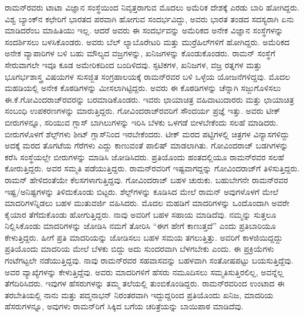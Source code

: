 ರಾಮನ್‍ರವರು ಟಾಟಾ ವಿಜ್ಞಾನ ಸಂಸ್ಥೆಯಿಂದ ನಿವೃತ್ತರಾಗುವ ಮೊದಲು ಅಮೆರಿಕ ದೇಶಕ್ಕೆ ಎರಡು ಬಾರಿ ಹೋಗಿದ್ದರು. ವಿಶ್ವ ಬ್ಯಾಂಕ್‍ನ ಕಛೇರಿಗೆ ಭಾರತದ ಪರವಾಗಿ ಹೋಗುವ ಸಂದರ್ಭವಿದ್ದು, ಅವರು ಭಾರತ ತಂಡದ ಸದಸ್ಯರಾಗಿ ಏನು ಮಾಡಿದರೆಂಬ ಮಾಹಿತಿಯು ಇಲ್ಲ. ಆದರೆ ಅವರು ಈ ಸಂದರ್ಭವನ್ನು ಅಮೆರಿಕದ ಅನೇಕ ವಿಜ್ಞಾನ ಸಂಸ್ಥೆಗಳನ್ನು ಸಂದರ್ಶಿಸಲು ಬಳಸಿಕೊಂಡರು. ಅವರು ಬೆಲ್ ಲ್ಯಾಬೊರೇಟರಿ ಮತ್ತು ಮುರ್ರೆಹಿಲ್‍ಗಳಿಗೆ ಹೋಗಿದ್ದರು. ಅಮೆರಿಕದ ಅನೇಕ ವ್ಯಾಪಾರಿಗಳ ಬಳಿ ಬಹು ಮೌಲ್ಯದ ವಜ್ರಗಳನ್ನು, ಖನಿಜಗಳನ್ನು ಕೊಂಡುಕೊಂಡರು. ರಾಮನ್ ಸಂಸ್ಥೆಗೆ ಸೇರುವಾಗಲೇ ಇವೂ ಕೂಡ ಅಮೇರಿಕದಿಂದ ಬಂದಿಳಿದವು. ಸ್ಫಟಿಕಗಳ, ಖನಿಜಗಳ, ವಜ್ರ ರತ್ನಗಳ ಮತ್ತು ಭೂಗರ್ಭಶಾಸ್ತ್ರ ವಿಷಯಗಳ ಸುಸಜ್ಜಿತ ಸಂಗ್ರಹಾಲಯಕ್ಕೆ ರಾಮನ್‍ರವರ ಬಳಿ ಒಳ್ಳೆಯ ಯೋಜನೆಗಳಿದ್ದವು. ಮೊದಲ ಮಹಡಿಯಲ್ಲಿ ಅನೇಕ ಕೊಠಡಿಗಳನ್ನು ಮೀಸಲಾಗಿಟ್ಟಿದ್ದರು. ಅವರು ಈ ಕೊಠಡಿಗಳನ್ನು ಚೆನ್ನಾಗಿ ಸಜ್ಜುಗೊಳಿಸಲು ಈ.ಕೆ.ಗೋವಿಂದರಾಜ್‍ರವರನ್ನು ಬರಮಾಡಿಕೊಂಡರು. ಇವರು ಛಾಯಾಚಿತ್ರ ವಹಿವಾಟುದಾರರು ಮತ್ತು ಛಾಯಾಚಿತ್ರ ಸಂಬಂಧಿ ಉಪಕರಣಗಳನ್ನು ಮಾರುತ್ತಿದ್ದರು. ಗೋವಿಂದರಾಜ್‍ರವರಿಗೆ ಸೌಂದರ್ಯ ಪ್ರಜ್ಞೆ ಇತ್ತು. ಅವರು ಟೀಕ್ ಬೀರುಗಳನ್ನೂ, ಸರಿಯುವ ಗ್ಲಾಸ್ ಬಾಗಿಲುಗಳನ್ನು ಇರಿಸಿ ಬೆಳಕು ಒಳಗಡೆ ಬೀಳಬೇಕೆಂದು ಸಲಹೆ ಮಾಡಿದರು. ಬೀರುಗಳೊಳಗೆ ಶೆಲ್ಫ್‌ಗಳು ಶೀಟ್ ಗ್ಲಾಸ್‍ನಿಂದ ಇರಬೇಕೆಂದರು. ಟೀಕ್ ಮರದ ಪಟ್ಟಿಗಳಲ್ಲಿ ಚಿತ್ರಗಳ ವಿನ್ಯಾಸಗಳಿದ್ದು ಅದಕ್ಕೆ ಮರದ ತೊಗಟೆಯ ಗೆರೆಗಳು ಎದ್ದು ಕಾಣುವಂತೆ ಪಾಲಿಷ್ ಮಾಡಲಾಗಿತು. ಗೋವಿಂದರಾಜ್ ಬಡಗಿಗಳನ್ನು ಕರೆಸಿ ಸಂಸ್ಥೆಯಲ್ಲೇ ಬೀರುಗಳನ್ನು ಮಾಡಿಸಿ ಜೋಡಿಸಿದರು. ಪ್ರತಿಯೊಂದು ಹಂತದಲ್ಲಿಯೂ ರಾಮನ್‍ರವರ ಸಲಹೆ ಕೋರುತ್ತಿದ್ದರು. ಅವರ ಸಮ್ಮತಿ ಪಡೆಯುತ್ತಿದ್ದರು. ರಾಮನ್‍ರವರಿಗೆ ಇಷ್ಟವಾಗದ್ದನ್ನು ಗೋವಿಂದರಾಜ್‍ಗೆ ತಿಳಿಸುತ್ತಿದ್ದರು. ರಾಮನ್ ಹೇಳಿದಂತೆಯೇ ಕೆಲಸಗಳಾಗುತ್ತಿದ್ದವು. ಗೋವಿಂದರಾಜ್ ಬಹಳ ಚುರುಕು. ಬಹುಬೇಗನೇ ರಾಮನ್‍ರವರ ಇಷ್ಟ/ಅನಿಷ್ಟಗಳನ್ನು ತಿಳಿದುಕೊಂಡು ಬಿಟ್ಟರು. ಶೆಲ್ಫ್‌ಗಳನ್ನು ಕೂಡಿಸಿದ ಮೇಲೆ ರಾಮನ್ ಅವುಗಳೊಳಗೆ ಮೇಲೆ ಮಾದರಿಗಳನ್ನಿಡಲು ಬಹಳ ಮುತುವರ್ಜಿ ವಹಿಸಿದರು. ಮೊದಲ ಮಹಡಿಗೆ ಮಾದರಿಗಳನ್ನು ಒಂದೊಂದಾಗಿ ಅವರೇ ಕೈಯಾರ ತೆಗೆದುಕೊಂಡು ಹೋಗುತ್ತಿದ್ದರು. ನಾವು ಅವರಿಗೆ ಬಹಳ ಸಹಾಯ ಮಾಡಿದೆವು. ನಮ್ಮನ್ನು ಸುತ್ತಲೂ ನಿಲ್ಲಿಸಿಕೊಂಡು ಮಾದರಿಗಳನ್ನು ಜೋಡಿಸಿ ನಮಗೆ ತೋರಿಸಿ “ಈಗ ಹೇಗೆ ಕಾಣುತ್ತದೆ” ಎಂದು ಪ್ರತಿಬಾರಿಯೂ ಕೇಳುತ್ತಿದ್ದರು. ಹೀಗೆ ಪ್ರತಿ ಮಾದರಿಯನ್ನು ಜೋಡಿಸಲು ಬಹಳ ಸಮಯ ತಗಲುತ್ತಿತ್ತು. ಅವರಿಗೆ ಕಾಳಜಿಯಿದ್ದದ್ದು ಪ್ರತಿಯೊಂದು ಮಾದರಿಯ ಮೇಲೆ ಬೆಳಕು ಬಿದ್ದು ಅದು ಸುಂದರವಾಗಿ ಬೆಳಗಬೇಕು ಎಂದು. ಈ ಪ್ರಕ್ರಿಯೆಗಳು ಗಂಟೆಗಟ್ಟಲೇ ನಡೆಯುತ್ತಿದ್ದವು. ನಾವು ರಾಮನ್‍ರವರ ಸಹವಾಸವನ್ನು ಬಹಳವಾಗಿ ಸಂತೋಷಪಟ್ಟು ಬಯಸುತ್ತಿದ್ದೆವು. ಅವರ ವ್ಯಾಖ್ಯೆಗಳನ್ನು ಕೇಳುತ್ತಿದ್ದೆವು. ಅವರು ಮಾದರಿಗಳಿಗೆ ಹೆಸರು ನಮೂದಿಸಲು ಸಮ್ಮತಿಸುತ್ತಿರಲಿಲ್ಲ, ಅವನ್ನೆಲ್ಲ ತೆಗೆದಿರಿಸಿದರು. ಇವುಗಳ ಹೆಸರುಗಳನ್ನು ತಮ್ಮ ತಲೆಯಲ್ಲಿ ತುಂಬಿಕೊಂಡಿದ್ದರು. ರಾಮನ್‍ರವರಿಂದ ಉಂಟಾದ ಈ ತರಬೇತಿಯಲ್ಲಿ ನಾನು ಮತ್ತು ಪದ್ಮನಾಭನ್ ನಿರಂತರವಾಗಿ ಇದ್ದುದ್ದರಿಂದ ಪ್ರತಿಯೊಂದು ಖನಿಜ, ಮಾದರಿಯ ಹೆಸರುಗಳನ್ನೂ, ಅವುಗಳು ರಾಮನ್‍ರಿಗೆ ಸಿಕ್ಕಿದ ಬಗೆಯ ಚರಿತ್ರೆಯನ್ನು ಬಾಯಿಪಾಠ ಮಾಡಿದೆವು.

